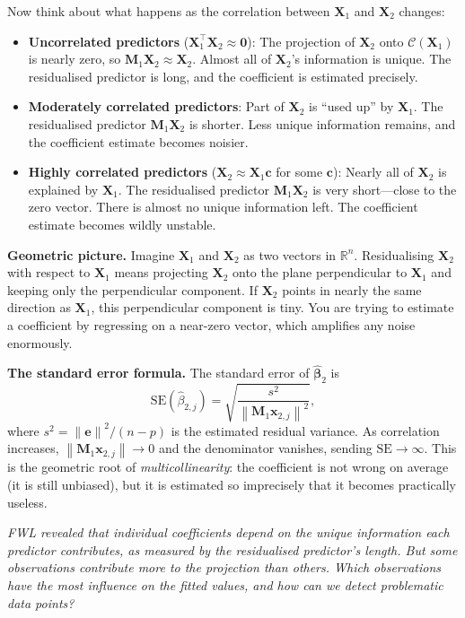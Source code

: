 \documentclass[11pt,a4paper]{article}
\theoremstyle{plain}
\theoremstyle{definition}
\newcommand{\R}{\mathbb{R}}
\newcommand{\bhat}{\hat{\bm{\beta}}}
\newcommand{\bX}{\bm{X}}
\newcommand{\be}{\bm{e}}
\newcommand{\bM}{\bm{M}}
\newcommand{\Col}{\mathcal{C}}
\newcommand{\norm}[1]{\left\lVert #1 \right\rVert}
\begin{document}
Now think about what happens as the correlation between $\bX_1$ and $\bX_2$ changes:
\begin{itemize}[nosep]
  \item \textbf{Uncorrelated predictors} ($\bX_1^\top\bX_2 \approx \bm{0}$):
    The projection of $\bX_2$ onto $\Col(\bX_1)$ is nearly zero, so $\bM_1\bX_2 \approx \bX_2$.
    Almost all of $\bX_2$'s information is unique. The residualised predictor is long, and the coefficient is estimated precisely.
  \item \textbf{Moderately correlated predictors}:
    Part of $\bX_2$ is ``used up'' by $\bX_1$. The residualised predictor $\bM_1\bX_2$ is shorter. Less unique information remains, and the coefficient estimate becomes noisier.
  \item \textbf{Highly correlated predictors} ($\bX_2\approx \bX_1\bm{c}$ for some $\bm{c}$):
    Nearly all of $\bX_2$ is explained by $\bX_1$. The residualised predictor $\bM_1\bX_2$ is very short---close to the zero vector. There is almost no unique information left. The coefficient estimate becomes wildly unstable.
\end{itemize}

\medskip
\noindent\textbf{Geometric picture.}
Imagine $\bX_1$ and $\bX_2$ as two vectors in $\R^n$.
Residualising $\bX_2$ with respect to $\bX_1$ means projecting $\bX_2$ onto the plane perpendicular to $\bX_1$ and keeping only the perpendicular component.
If $\bX_2$ points in nearly the same direction as $\bX_1$, this perpendicular component is tiny.
You are trying to estimate a coefficient by regressing on a near-zero vector, which amplifies any noise enormously.

\medskip
\noindent\textbf{The standard error formula.}
The standard error of $\bhat_2$ is
\[
  \text{SE}(\hat{\beta}_{2,j})
  = \sqrt{\frac{s^2}{\norm{\bM_1\bm{x}_{2,j}}^2}},
\]
where $s^2 = \norm{\be}^2/(n-p)$ is the estimated residual variance.
As correlation increases, $\norm{\bM_1\bm{x}_{2,j}}\to 0$ and the denominator vanishes,
sending $\text{SE}\to\infty$.
This is the geometric root of \emph{multicollinearity}: the coefficient is not wrong on average (it is still unbiased), but it is estimated so imprecisely that it becomes practically useless.

\medskip
\noindent\textit{FWL revealed that individual coefficients depend on
the unique information each predictor contributes, as measured by
the residualised predictor's length.
But some observations contribute more to the projection than others.
Which observations have the most influence on the fitted values,
and how can we detect problematic data points?}
\end{document}
